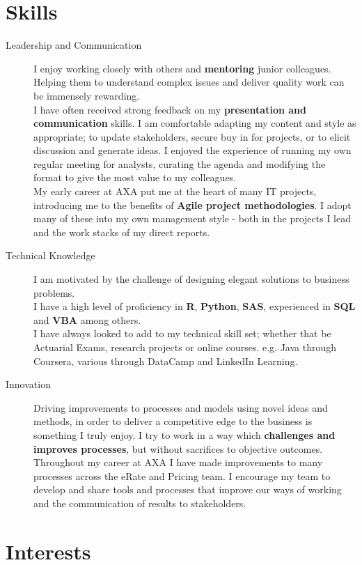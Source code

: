 \documentclass[11pt]{article}
\begin{document}
\section*{Skills}
\begin{description}
\item[Leadership and Communication] I enjoy working closely with others and \textbf{mentoring} junior colleagues. Helping them to understand complex issues and deliver quality work can be immensely rewarding. \\
I have often received strong feedback on my \textbf{presentation and communication} skills. I am comfortable adapting my content and style as appropriate; to update stakeholders, secure buy in for projects, or to elicit discussion and generate ideas.
I enjoyed the experience of running my own regular meeting for analysts, curating the agenda and modifying the format to give the most value to my colleagues.\\
My early career at AXA put me at the heart of many IT projects, introducing me to the benefits of \textbf{Agile project methodologies}. I adopt many of these into my own management  style - both in the projects I lead and the work stacks of my direct reports.
\item[Technical Knowledge] I am motivated by the challenge of designing elegant solutions to business problems. \\
I have a high level of proficiency in \textbf{R}, \textbf{Python}, \textbf{SAS}, experienced in \textbf{SQL} and \textbf{VBA} among others.\\
I have always looked to add to my technical skill set; whether that be Actuarial Exams, research projects or online courses. e.g. Java through Coursera, various through DataCamp and LinkedIn Learning.
\item[Innovation] Driving improvements to processes and models using novel ideas and methods, in order to deliver a competitive edge to the business is something I truly enjoy. 
I try to work in a way which \textbf{challenges and improves processes}, but without sacrifices to objective outcomes.\\
Throughout my career at AXA I have made improvements to many processes across the eRate and Pricing team. I encourage my team to develop and share tools and processes that improve our ways of working and the communication of results to stakeholders.
\end{description} 

\section*{Interests}
\end{document}

